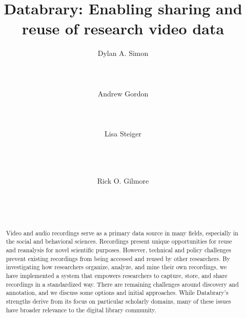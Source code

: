 \documentclass{sig-alternate}
\begin{document}

\title{Databrary: Enabling sharing and reuse of research video data}


\author{
\alignauthor
Dylan A. Simon\\
	\\
	\\
	\\
\alignauthor
Andrew Gordon\\
	\\
	\\
	\\
\alignauthor
Lisa Steiger\\
	\\
	\\
	\\
\and
Rick O. Gilmore\\
	\\
	\\
	\\
}

\maketitle

\begin{abstract}
Video and audio recordings serve as a primary data source in many fields, especially in the social and behavioral sciences.
Recordings present unique opportunities for reuse and reanalysis for novel scientific purposes.
However, technical and policy challenges prevent existing recordings from being accessed and reused by other researchers.
By investigating how researchers organize, analyze, and mine their own recordings, we have implemented a system that empowers researchers to capture, store, and share recordings in a standardized way.
There are remaining challenges around discovery and annotation, and we discuss some options and initial approaches.
While Databrary's strengths derive from its focus on particular scholarly domains, many of these issues have broader relevance to the digital library community.
\end{abstract}
\end{document}
